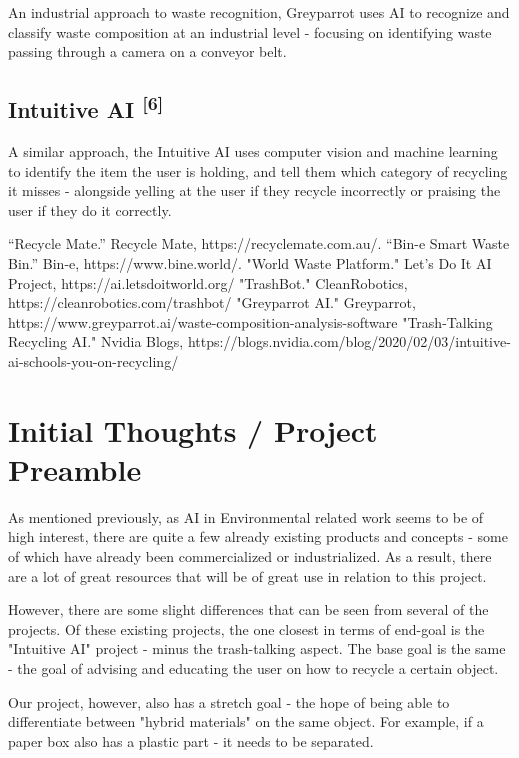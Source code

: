 \documentclass[conference]{IEEEtran}
\begin{document}
An industrial approach to waste recognition, Greyparrot uses AI to recognize and classify waste composition at an industrial level - focusing on identifying waste passing through a camera on a conveyor belt.

\subsection{Intuitive AI \textsuperscript{[6]}}

A similar approach, the Intuitive AI uses computer vision and machine learning to identify the item the user is holding, and tell them which category of recycling it misses - alongside yelling at the user if they recycle incorrectly or praising the user if they do it correctly.
  
\begin{thebibliography}{00}
 “Recycle Mate.” Recycle Mate, https://recyclemate.com.au/. 
 “Bin-e Smart Waste Bin.” Bin-e, https://www.bine.world/. 
 "World Waste Platform." Let's Do It AI Project, https://ai.letsdoitworld.org/
 "TrashBot." CleanRobotics, https://cleanrobotics.com/trashbot/
 "Greyparrot AI." Greyparrot, https://www.greyparrot.ai/waste-composition-analysis-software
 "Trash-Talking Recycling AI." Nvidia Blogs, https://blogs.nvidia.com/blog/2020/02/03/intuitive-ai-schools-you-on-recycling/
\end{thebibliography}

\section{Initial Thoughts / Project Preamble}
As mentioned previously, as AI in Environmental related work seems to be of high interest, there are quite a few already existing products and concepts - some of which have already been commercialized or industrialized. As a result, there are a lot of great resources that will be of great use in relation to this project. 

However, there are some slight differences that can be seen from several of the projects. Of these existing projects, the one closest in terms of end-goal is the "Intuitive AI" project - minus the trash-talking aspect. The base goal is the same - the goal of advising and educating the user on how to recycle a certain object.

Our project, however, also has a stretch goal - the hope of being able to differentiate between "hybrid materials" on the same object. For example, if a paper box also has a plastic part - it needs to be separated.
\end{document}
